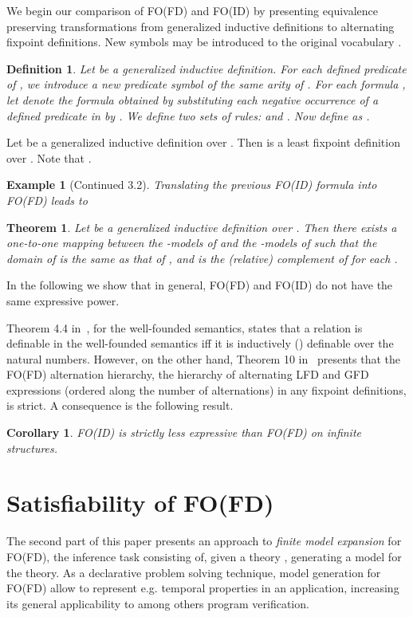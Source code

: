 \documentclass{tlp}
\newtheorem{theorem}[lemma]{Theorem}
\newtheorem{corollary}[lemma]{Corollary}
\newtheorem{example}[lemma]{Example}
\newtheorem{definition}[lemma]{Definition}
\begin{document}
We begin our comparison of FO(FD) and FO(ID) by presenting equivalence preserving transformations from generalized inductive definitions to alternating fixpoint definitions. New symbols may be introduced to the original vocabulary .

\begin{definition}
Let  be a generalized inductive definition. For each defined predicate  of , we introduce a new predicate symbol  of the same arity of . For each formula , let  denote the formula obtained by substituting each negative occurrence  of a defined predicate  in  by . We define two sets of rules:  and . Now define  as .
\end{definition}

Let  be a generalized inductive definition over . Then  is a least fixpoint definition over . Note that .

\begin{example}[Continued 3.2]
Translating the previous FO(ID) formula into FO(FD) leads to


\end{example}

\begin{theorem}
Let  be a generalized inductive definition over . Then there exists a one-to-one mapping between the -models  of  and the -models  of  such that the domain of  is the same as that of ,  and  is the (relative) complement of  for each .
\end{theorem}

In the following we show that in general, FO(FD) and FO(ID) do not have the same expressive power.

Theorem 4.4 in~\cite{jcss/Schlipf95}, for the well-founded semantics, states that a relation is definable in the well-founded semantics iff it is inductively () definable over the natural numbers. However, on the other hand, Theorem 10 in~\cite{concur/Bradfield96} presents that the FO(FD) alternation hierarchy, the hierarchy of alternating LFD and GFD expressions (ordered along the number of alternations) in any fixpoint definitions, is strict. A consequence is the following result.
\begin{corollary}
FO(ID) is strictly less expressive than FO(FD) on infinite structures.
\end{corollary}

\section{Satisfiability of FO(FD)}\label{sec:satfd}
The second part of this paper presents an approach to \emph{finite model expansion} for FO(FD), the inference task consisting of, given a theory , generating a model for the theory. As a declarative problem solving technique, model generation for FO(FD) allow to represent e.g. temporal properties in an application, increasing its general applicability to among others program verification.
\end{document}
